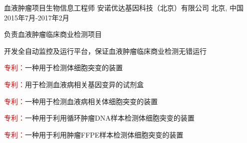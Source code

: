 \begin{cventries}
  \cventry
    {血液肿瘤项目生物信息工程师} %
    {安诺优达基因科技（北京）有限公司} %
    {北京, 中国} %
    {2015年7月-2017年2月} %
    {
      \begin{cvitems} %
        \item {负责血液肿瘤临床商业检测项目}
        \item {开发全自动监控及运行平台，保证血液肿瘤临床商业检测无错运行}
        \item {\textcolor{red}{专利：}一种用于检测体细胞突变的装置}
        \item {\textcolor{red}{专利：}用于检测血液病相关基因变异的试剂盒}
        \item {\textcolor{red}{专利：}一种用于检测血液病相关体细胞突变的装置}
        \item {\textcolor{red}{专利：}一种用于利用循环肿瘤DNA样本检测体细胞突变的装置}
        \item {\textcolor{red}{专利：}一种用于利用肿瘤FFPE样本检测体细胞突变的装置 }
      \end{cvitems}
    }



\end{cventries}